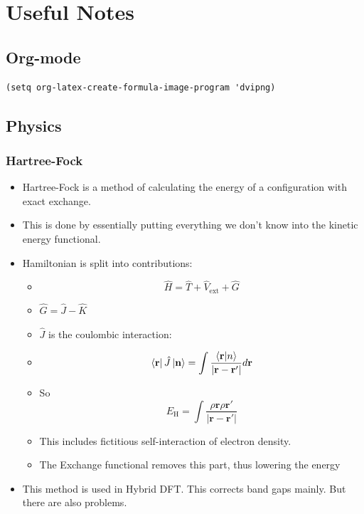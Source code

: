 \documentclass[11pt]{article}
\begin{document}
\section{Useful Notes}
\label{sec-4}
\subsection{Org-mode}
\label{sec-4-1}
\begin{verbatim}
(setq org-latex-create-formula-image-program 'dvipng)
\end{verbatim}

\subsection{Physics}
\label{sec-4-2}
\subsubsection{Hartree-Fock}
\label{sec-4-2-1}
\begin{itemize}
\item Hartree-Fock is a method of calculating the energy of a configuration
with exact exchange.
\item This is done by essentially putting everything we don't know into the
kinetic energy functional.
\item Hamiltonian is split into contributions:
\begin{itemize}
\item \[\hat{H} = \hat{T} + \hat{V}_{ \text{ext} } + \hat{G}\]
\item $\hat{G} = \hat{J} - \hat{K}$
\item $\hat{J}$ is the coulombic interaction:
\item \[ \bra{ \mathbf{r} } \hat{J} \ket{ \mathbf{n} } = \int \frac{ \bra{\mathbf{r}}\ket{n} }{|\mathbf{r} - \mathbf{r'}  |}d\mathbf{r} \]
\item So \[ E_{\text{H}} = \int \frac{\rho{\mathbf{r}\rho{\mathbf{r}'}}}{|\mathbf{r} - \mathbf{r'}|}\]
\item This includes fictitious self-interaction of electron density.
\item The Exchange functional removes this part, thus lowering the energy
\end{itemize}

\item This method is used in Hybrid DFT. This corrects band gaps mainly. But
there are also problems.
\end{itemize}
\end{document}
